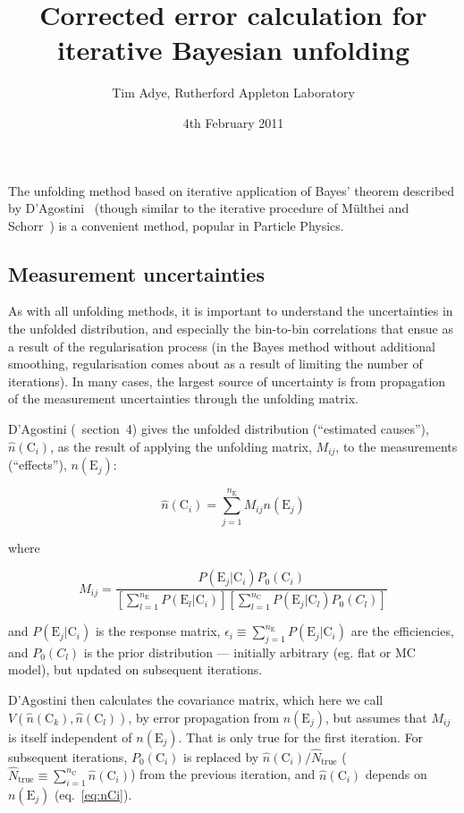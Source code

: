\documentclass[12pt,a4paper]{article}
\newcommand{\E}{\mathrm{E}}
\newcommand{\C}{\mathrm{C}}
\begin{document}
\title{Corrected error calculation for iterative Bayesian unfolding}
\author{Tim Adye, Rutherford Appleton Laboratory}
\date{4th February 2011}
\maketitle

The unfolding method based on iterative application of Bayes' theorem
described by D'Agostini~\cite{D'Agostini:1994zf}
(though similar to the iterative procedure of
M\"ulthei and Schorr~\cite{Multhei:1986ps})
is a convenient method, popular in Particle Physics.

\subsection{Measurement uncertainties}

As with all unfolding methods, it is important to understand
the uncertainties in the unfolded distribution, and especially the bin-to-bin correlations
that ensue as a result of the regularisation process (in the Bayes method without additional smoothing, regularisation
comes about as a result of limiting the number of iterations).
In many cases, the largest source of uncertainty is from propagation of the measurement
uncertainties through the unfolding matrix.

D'Agostini (\cite{D'Agostini:1994zf}~section~4) gives the unfolded distribution (``estimated causes''), $\hat{n}(\C_i)$,
as the result of applying the unfolding matrix, $M_{ij}$, to the measurements (``effects''), $n(\E_j)$:

\begin{equation}
\hat{n}(\C_i) = \sum_{j=1}^{n_{\E}} M_{ij} n(\E_j)
\label{eq:nCi}
\end{equation}

\noindent where

\begin{equation}
M_{ij} = \frac{P(\E_j|\C_i) P_0(\C_i)}{[\sum_{l=1}^{n_{\E}} P(\E_l|\C_i)] [\sum_{l=1}^{n_{\C}} P(\E_j|\C_l) P_0(C_l)]}
\end{equation}

\noindent and $P(\E_j|\C_i)$ is the response matrix, $\epsilon_i \equiv \sum_{j=1}^{n_{\E}} P(\E_j|\C_i)$ are the efficiencies,
and $P_0(C_l)$ is the prior distribution --- initially arbitrary (eg. flat or MC model), but updated on
subsequent iterations.

D'Agostini then calculates the covariance matrix, which here we call $V(\hat{n}(\C_k),\hat{n}(\C_l))$,
by error propagation from $n(\E_j)$,
but assumes that $M_{ij}$ is itself independent of $n(\E_j)$. That is only true for the first iteration.
For subsequent iterations, $P_0(\C_i)$ is replaced by $\hat{n}(\C_i) / \hat{N}_{\mathrm{true}}$
($\hat{N}_{\mathrm{true}} \equiv \sum_{i=1}^{n_{\C}} \hat{n}(\C_i)$) from the
previous iteration, and $\hat{n}(\C_i)$ depends on $n(\E_j)$ (eq.~\ref{eq:nCi}).
\end{document}
